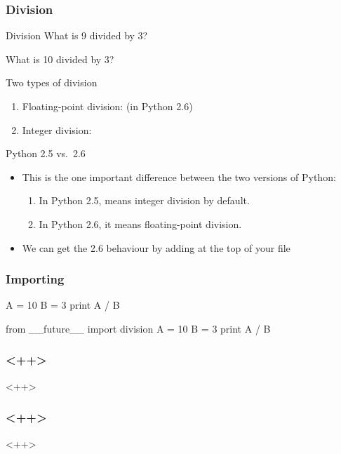 \begin{frame}[fragile]
\frametitle{Division}
\begin{block}{Division}
What is 9 divided by 3?

What is 10 divided by 3?
\end{block}

\begin{block}{Two types of division}
\begin{enumerate}
\item Floating-point division:  (in Python 2.6)
\item Integer division: 
\end{enumerate}
\end{block}

\begin{block}{Python 2.5 vs.\ 2.6}
\begin{itemize}
\item This is the one important difference between the two versions of Python:
\begin{enumerate}
\item In Python 2.5,  means \alert{integer division} by default.
\item In Python 2.6, it means \alert{floating-point division}.
\end{enumerate}
\item We can get the 2.6 behaviour by adding  at the top of your file
\end{itemize}
\end{block}
\end{frame}

\begin{frame}[fragile]
\frametitle{Importing}

\begin{python}
A = 10
B = 3
print A / B
\end{python}

\begin{python}
from __future__ import division
A = 10
B = 3
print A / B
\end{python}
\end{frame}


\begin{frame}[fragile]
\frametitle{<++>}
<++>
\end{frame}

\begin{frame}[fragile]
\frametitle{<++>}
<++>
\end{frame}

